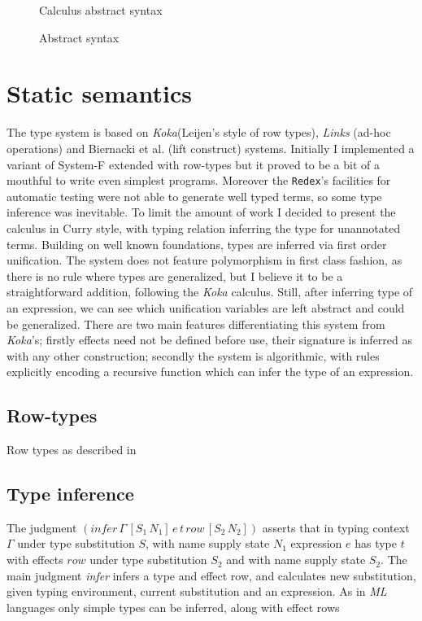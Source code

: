 \documentclass[inz, english, shortabstract]{iithesis}
\begin{document}
\begin{figure}
  Calculus abstract syntax
  \caption{Abstract syntax}
  \label{fig:algeff-syntax}
\end{figure}

\section{Static semantics}
The type system is based on \emph{Koka}(Leijen's style of row types\cite{Leijen2005}), \emph{Links}\cite{Hillerstrom2016} (ad-hoc operations) and Biernacki et al. \cite{Biernacki2017} (lift construct) systems.
Initially I implemented a variant of System-F extended with row-types but it proved to be a bit of a mouthful to write even simplest programs.
Moreover the \texttt{Redex}'s facilities for automatic testing were not able to generate well typed terms, so some type inference was inevitable.
To limit the amount of work I decided to present the calculus in Curry style, with typing relation inferring the type for unannotated terms.
Building on well known foundations, types are inferred via first order unification.
The system does not feature polymorphism in first class fashion, as there is no rule where types are generalized, but I believe it to be a straightforward addition, following the \emph{Koka}\cite{Leijen2014} calculus.
Still, after inferring type of an expression, we can see which unification variables are left abstract and could be generalized.
There are two main features differentiating this system from \emph{Koka}'s; firstly effects need not be defined before use, their signature is inferred as with any other construction; secondly the system is algorithmic, with rules explicitly encoding a recursive function which can infer the type of an expression.

\subsection{Row-types}
Row types as described in \cite{Leijen2005}

\subsection{Type inference}
The judgment $ (infer \, \Gamma \, [S_1 \, N_1] \, e \, t \, row \, [S_2 \, N_2]) $ asserts that in typing context $ \Gamma $ under type substitution $ S $, with name supply state $ N_1 $ expression $ e $ has type $ t $ with effects $ row $ under type substitution $ S_2 $ and with name supply state $ S_2 $.
The main judgment \emph{infer} infers a type and effect row, and calculates new substitution, given typing environment, current substitution and an expression.
As in \emph{ML} languages only simple types can be inferred, along with effect rows 
\end{document}
